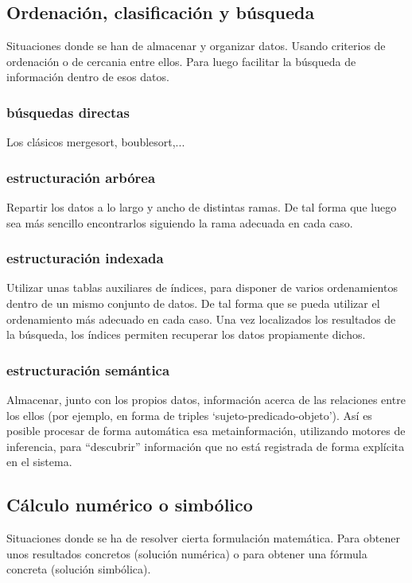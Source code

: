 \documentclass[spanish,12pt,a4paper,final,oneside]{book}
\begin{document}
\subsection{Ordenación, clasificación y búsqueda}
Situaciones donde se han de almacenar y organizar datos.  Usando criterios de ordenación o de cercania entre ellos. Para luego facilitar la búsqueda de información dentro de esos datos.

\subsubsection{búsquedas directas}
Los clásicos mergesort, boublesort,...

\subsubsection{estructuración arbórea}
Repartir los datos a lo largo y ancho de distintas ramas. De tal forma que luego sea más sencillo encontrarlos siguiendo la rama adecuada en cada caso.

\subsubsection{estructuración indexada}
Utilizar unas tablas auxiliares de índices, para disponer de varios ordenamientos dentro de un mismo conjunto de datos. De tal forma que se pueda utilizar el ordenamiento más adecuado en cada caso. Una vez localizados los resultados de la búsqueda, los índices permiten recuperar los datos propiamente dichos.

\subsubsection{estructuración semántica}
Almacenar, junto con los propios datos, información acerca de las relaciones entre los ellos (por ejemplo, en forma de triples `sujeto-predicado-objeto'). Así es posible procesar de forma automática esa metainformación, utilizando motores de inferencia, para ``descubrir'' información que no está registrada de forma explícita en el sistema.

\subsection{Cálculo numérico o simbólico}
Situaciones donde se ha de resolver cierta formulación matemática. Para obtener unos resultados concretos (solución numérica) o para obtener una fórmula concreta (solución simbólica).
\end{document}
